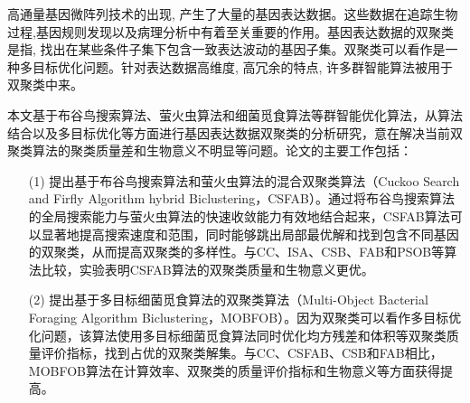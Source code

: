 \begin{cabstract}
  高通量基因微阵列技术的出现, 产生了大量的基因表达数据。这些数据在追踪生物过程,基因规则发现以及病理分析中有着至关重要的作用。基因表达数据的双聚类是指, 找出在某些条件子集下包含一致表达波动的基因子集。双聚类可以看作是一种多目标优化问题。针对表达数据高维度, 高冗余的特点, 许多群智能算法被用于双聚类中来。

  本文基于布谷鸟搜索算法、萤火虫算法和细菌觅食算法等群智能优化算法，从算法结合以及多目标优化等方面进行基因表达数据双聚类的分析研究，意在解决当前双聚类算法的聚类质量差和生物意义不明显等问题。论文的主要工作包括：

  \begin{itemize}
    \item[(1)] 提出基于布谷鸟搜索算法和萤火虫算法的混合双聚类算法（Cuckoo Search and Firfly Algorithm hybrid Biclustering，CSFAB）。通过将布谷鸟搜索算法的全局搜索能力与萤火虫算法的快速收敛能力有效地结合起来，CSFAB算法可以显著地提高搜索速度和范围，同时能够跳出局部最优解和找到包含不同基因的双聚类，从而提高双聚类的多样性。与CC、ISA、CSB、FAB和PSOB等算法比较，实验表明CSFAB算法的双聚类质量和生物意义更优。

    \item[(2)] 提出基于多目标细菌觅食算法的双聚类算法（Multi-Object Bacterial Foraging Algorithm Biclustering，MOBFOB）。因为双聚类可以看作多目标优化问题，该算法使用多目标细菌觅食算法同时优化均方残差和体积等双聚类质量评价指标，找到占优的双聚类解集。与CC、CSFAB、CSB和FAB相比，MOBFOB算法在计算效率、双聚类的质量评价指标和生物意义等方面获得提高。
  \end{itemize}


\end{cabstract}

